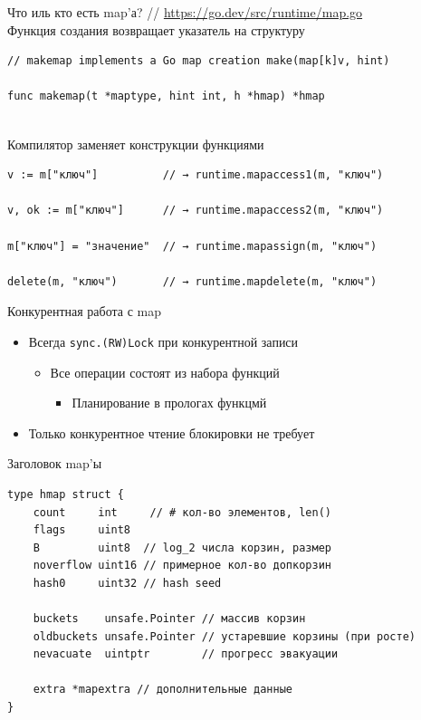 \documentclass[aspectratio=169]{beamer}
\begin{document}
\begin{frame}[fragile]{Что иль кто есть map'а?}
        // \textcolor{blue}{\href{https://go.dev/src/runtime/map.go}{https://go.dev/src/runtime/map.go}}
        ~\\
        Функция создания возвращает указатель на структуру
        \begin{lstlisting}
// makemap implements a Go map creation make(map[k]v, hint)

func makemap(t *maptype, hint int, h *hmap) *hmap\end{lstlisting}
        ~\\
        Компилятор заменяет конструкции функциями
        \begin{lstlisting}
v := m["ключ"]          // → runtime.mapaccess1(m, "ключ")

v, ok := m["ключ"]      // → runtime.mapaccess2(m, "ключ")

m["ключ"] = "значение"  // → runtime.mapassign(m, "ключ")

delete(m, "ключ")       // → runtime.mapdelete(m, "ключ")\end{lstlisting}
\end{frame}

\begin{frame}{Конкурентная работа с map}
        \begin{itemize}
                \item Всегда \texttt{sync.(RW)Lock} при конкурентной записи
                \begin{itemize}
                        \item Все операции состоят из набора функций
                        \begin{itemize}
                                \item Планирование в прологах функцмй
                        \end{itemize}
                \end{itemize}
                \item Только конкурентное чтение блокировки не требует
        \end{itemize}
\end{frame}

\begin{frame}[fragile]{Заголовок map'ы}
        \begin{lstlisting}
type hmap struct {
    count     int     // # кол-во элементов, len()
    flags     uint8
    B         uint8  // log_2 числа корзин, размер
    noverflow uint16 // примерное кол-во допкорзин
    hash0     uint32 // hash seed

    buckets    unsafe.Pointer // массив корзин
    oldbuckets unsafe.Pointer // устаревшие корзины (при росте)
    nevacuate  uintptr        // прогресс эвакуации

    extra *mapextra // дополнительные данные
}\end{lstlisting}
\end{frame}
\end{document}
